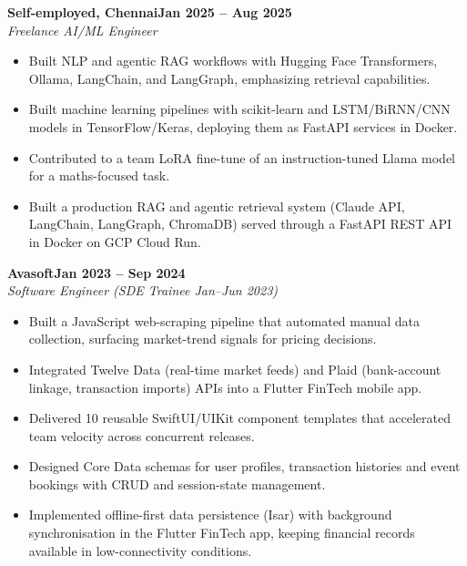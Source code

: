 \documentclass[a4paper,11pt]{article}
\newcommand{\entry}[4]{\needspace{4\baselineskip}\noindent\textbf{#1}\hfill\textbf{#2}\\ \textit{#3}\hfill\textit{#4}\par}
\begin{document}
\vspace{4pt}
\entry{Self-employed, Chennai}{Jan 2025 – Aug 2025}{Freelance AI/ML Engineer}{}
\begin{itemize}
  \item Built NLP and agentic RAG workflows with Hugging Face Transformers, Ollama, LangChain, and LangGraph, emphasizing retrieval capabilities.
  \item Built machine learning pipelines with scikit-learn and LSTM/BiRNN/CNN models in TensorFlow/Keras, deploying them as FastAPI services in Docker.
  \item Contributed to a team LoRA fine-tune of an instruction-tuned Llama model for a maths-focused task.
  \item Built a production RAG and agentic retrieval system (Claude API, LangChain, LangGraph, ChromaDB) served through a FastAPI REST API in Docker on GCP Cloud Run.
\end{itemize}
\vspace{4pt}
\entry{Avasoft}{Jan 2023 – Sep 2024}{Software Engineer (SDE Trainee Jan–Jun 2023)}{}
\begin{itemize}
  \item Built a JavaScript web-scraping pipeline that automated manual data collection, surfacing market-trend signals for pricing decisions.
  \item Integrated Twelve Data (real-time market feeds) and Plaid (bank-account linkage, transaction imports) APIs into a Flutter FinTech mobile app.
  \item Delivered 10 reusable SwiftUI/UIKit component templates that accelerated team velocity across concurrent releases.
  \item Designed Core Data schemas for user profiles, transaction histories and event bookings with CRUD and session-state management.
  \item Implemented offline-first data persistence (Isar) with background synchronisation in the Flutter FinTech app, keeping financial records available in low-connectivity conditions.
\end{itemize}

\end{document}

